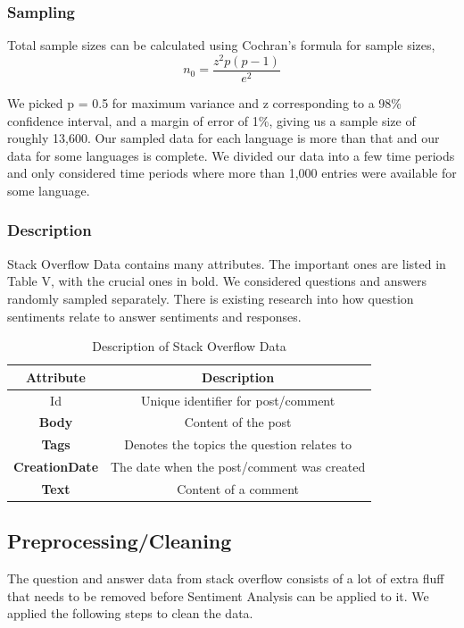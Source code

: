 \documentclass[conference]{IEEEtran}
\begin{document}
\subsubsection{Sampling} Total sample sizes can be calculated using Cochran's formula for sample sizes\cite{b9, b12}, 
\begin{equation}
    n_0 = \frac{z^2p(p-1)}{e^2}
\end{equation}

We picked p = 0.5 for maximum variance and z corresponding to a 98\% confidence interval, and a margin of error of 1\%, giving us a sample size of roughly 13,600. Our sampled data for each language is more than that and our data for some languages is complete. We divided our data into a few time periods and only considered time periods where more than 1,000 entries were available for some language.\\

\subsubsection{Description}
Stack Overflow Data contains many attributes. The important ones are listed in Table V, with the crucial ones in bold. We considered questions and answers randomly sampled separately. There is existing research into how question sentiments relate to answer sentiments and responses\cite{b30, b3}. \\

\begin{table}[htbp]
\caption{Description of Stack Overflow Data}
\begin{center}
\begin{tabular}{|c|c|}
\hline
\textbf{Attribute}&\textbf{Description}\\
\hline
Id&Unique identifier for post/comment\\
\hline
\textbf{Body}&Content of the post\\
\hline
\textbf{Tags}&Denotes the topics the question relates to\\
\hline
\textbf{CreationDate}&The date when the post/comment was created\\
\hline
\textbf{Text}&Content of a comment\\
\hline
\end{tabular}
\label{tab1}
\end{center}
\end{table}

\subsection{Preprocessing/Cleaning}
The question and answer data from stack overflow consists of a lot of extra fluff that needs to be removed before Sentiment Analysis can be applied to it. We applied the following steps to clean the data.
\end{document}
